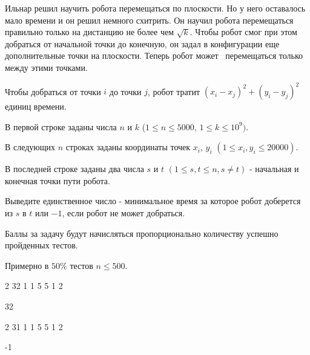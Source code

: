 
Ильнар решил научить робота перемещаться по плоскости. Но у него оставалось мало времени 
и он решил немного схитрить. Он научил робота перемещаться правильно только на 
дистанцию не более чем $\sqrt k$. Чтобы робот смог при этом добраться от начальной точки до 
конечную, он задал в конфигурации еще дополнительные точки на плоскости. Теперь робот может \
перемещаться только между этими точками. 

Чтобы добраться от точки $i$ до точки $j$, робот тратит $(x_i-x_j)^2 + (y_i-y_j)^2$ единиц времени.


В первой строке заданы числа $n$ и $k$ ($1 \leq n \leq 5000$, $1 \leq k \leq 10^{9})$.

В следующих $n$ строках заданы координаты точек $x_{i}$, $y_{i}$ $(1 \leq x_{i}, y_{i} \leq 20000)$.

В последней строке заданы два числа $s$ и $t$ $(1 \leq s, t \leq n, s \neq t )$ - начальная и конечная точки пути робота.

\outputfmtSection

Выведите единственное число - минимальное время за которое робот доберется из $s$ в $t$ или $-1$, если робот не может добраться.

\markSection

Баллы за задачу будут начисляться пропорционально количеству успешно пройденных тестов.

Примерно в $50\%$ тестов $n \leq 500$.


\begin{myverbbox}[\small]{\vinput}
    2 32
    1 1
    5 5
    1 2
\end{myverbbox}
\begin{myverbbox}[\small]{\voutput}
    32
\end{myverbbox}
\inputoutputTable

\sampleTitle{2}

\begin{myverbbox}[\small]{\vinput}
    2 31
    1 1
    5 5
    1 2
\end{myverbbox}
\begin{myverbbox}[\small]{\voutput}
    -1
\end{myverbbox}

